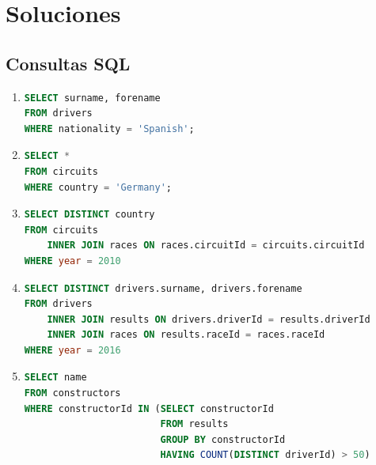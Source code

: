 \documentclass{db-practice}
\begin{document}
\section{Soluciones}

\subsection{Consultas SQL}

\begin{enumerate}

\item 
\begin{lstlisting}[language=SQL]
SELECT surname, forename
FROM drivers 
WHERE nationality = 'Spanish';
\end{lstlisting}

\item 
\begin{lstlisting}[language=SQL]
SELECT *
FROM circuits 
WHERE country = 'Germany';
\end{lstlisting}

\item
\begin{lstlisting}[language=SQL]
SELECT DISTINCT country
FROM circuits
    INNER JOIN races ON races.circuitId = circuits.circuitId
WHERE year = 2010
\end{lstlisting}

\item
\begin{lstlisting}[language=SQL]
SELECT DISTINCT drivers.surname, drivers.forename
FROM drivers 
    INNER JOIN results ON drivers.driverId = results.driverId
    INNER JOIN races ON results.raceId = races.raceId
WHERE year = 2016
\end{lstlisting}

\item
\begin{lstlisting}[language=SQL]
SELECT name
FROM constructors
WHERE constructorId IN (SELECT constructorId
                        FROM results
                        GROUP BY constructorId
                        HAVING COUNT(DISTINCT driverId) > 50)
\end{lstlisting}


\end{enumerate}
\end{document}
